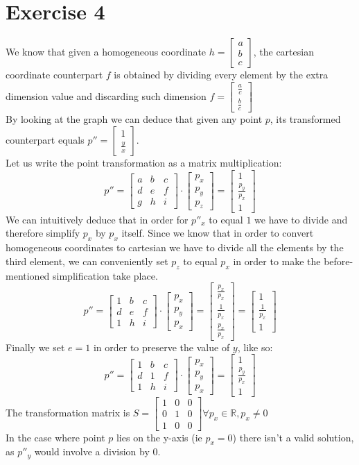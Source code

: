 \documentclass[tikz,14pt,fleqn]{article}
\newcommand{\bmat}[1]{
   \ensuremath{
   \begin{bmatrix}
       #1
   \end{bmatrix}
}}
\begin{document}
\section{Exercise 4}
We know that given a homogeneous coordinate $h = \bmat{a\\b\\c}$, the cartesian coordinate counterpart $f$ is obtained by dividing every element by the extra dimension value and discarding such dimension $f = \bmat{\frac{a}{c}\\\frac{b}{c}}$\\
By looking at the graph we can deduce that given any point $p$, its transformed counterpart equals $p'' = \bmat{1\\\frac{y}{x}}$.\\
Let us write the point transformation as a matrix multiplication:
\[
p''  = \bmat{a&b&c\\d&e&f\\g&h&i} \cdot \bmat{p_x\\p_y\\p_z} = \bmat{1\\\frac{p_y}{p_x}\\1}
\]
We can intuitively deduce that in order for $p''_x$ to equal $1$ we have to divide and therefore simplify $p_x$ by $p_x$ itself. Since we know that in order to convert homogeneous coordinates to cartesian we have to divide all the elements by the third element, we can conveniently set $p_z$ to equal $p_x$ in order to make the before-mentioned simplification take place.
\[
p''  = \bmat{1&b&c\\d&e&f\\1&h&i} \cdot \bmat{p_x\\p_y\\p_x} = \bmat{\frac{p_x}{p_x}\\\frac{1}{p_x}\\\frac{p_x}{p_x}} = \bmat{1\\\frac{1}{p_x}\\1}
\]
Finally we set $e = 1$ in order to preserve the value of $y$, like so:
\[
p''  = \bmat{1&b&c\\d&1&f\\1&h&i} \cdot \bmat{p_x\\p_y\\p_x} = \bmat{1\\\frac{p_y}{p_x}\\1}
\]
The transformation matrix is $S = \bmat{1&0&0\\0&1&0\\1&0&0}\forall p_x \in \mathds{R}, p_x \neq 0$\\
In the case where point $p$ lies on the y-axis (ie $p_x = 0$) there isn't a valid solution, as $p''_y$ would involve a division by $0$.
\end{document}
